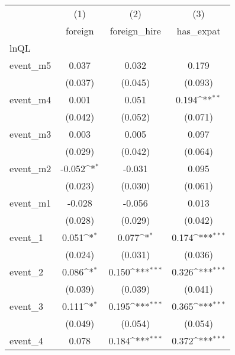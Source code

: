 {
\def\sym#1{\ifmmode^{#1}\else\(^{#1}\)\fi}
\begin{tabular}{l*{3}{c}}
\hline\hline
            &\multicolumn{1}{c}{(1)}&\multicolumn{1}{c}{(2)}&\multicolumn{1}{c}{(3)}\\
            &\multicolumn{1}{c}{foreign}&\multicolumn{1}{c}{foreign\_hire}&\multicolumn{1}{c}{has\_expat}\\
\hline
lnQL        &                     &                     &                     \\
event\_m5    &       0.037         &       0.032         &       0.179         \\
            &     (0.037)         &     (0.045)         &     (0.093)         \\
[1em]
event\_m4    &       0.001         &       0.051         &       0.194\sym{**} \\
            &     (0.042)         &     (0.052)         &     (0.071)         \\
[1em]
event\_m3    &       0.003         &       0.005         &       0.097         \\
            &     (0.029)         &     (0.042)         &     (0.064)         \\
[1em]
event\_m2    &      -0.052\sym{*}  &      -0.031         &       0.095         \\
            &     (0.023)         &     (0.030)         &     (0.061)         \\
[1em]
event\_m1    &      -0.028         &      -0.056         &       0.013         \\
            &     (0.028)         &     (0.029)         &     (0.042)         \\
[1em]
event\_1     &       0.051\sym{*}  &       0.077\sym{*}  &       0.174\sym{***}\\
            &     (0.024)         &     (0.031)         &     (0.036)         \\
[1em]
event\_2     &       0.086\sym{*}  &       0.150\sym{***}&       0.326\sym{***}\\
            &     (0.039)         &     (0.039)         &     (0.041)         \\
[1em]
event\_3     &       0.111\sym{*}  &       0.195\sym{***}&       0.365\sym{***}\\
            &     (0.049)         &     (0.054)         &     (0.054)         \\
[1em]
event\_4     &       0.078         &       0.184\sym{***}&       0.372\sym{***}\\

\end{tabular}}
